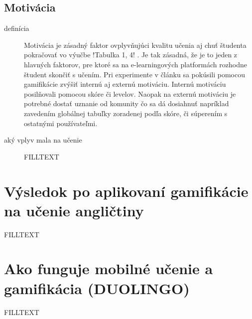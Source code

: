 \documentclass[10pt,slovak,a4paper]{article}
\begin{document}
\subsection{Motivácia} \label{motivation}
\begin{description}
    \item [definícia] Motivácia je zásadný faktor ovplyvňujúci kvalitu učenia aj chuť študenta pokračovať vo výučbe !Tabulka 1, 4! . Je tak zásadná, že je to jeden z hlavných faktorov, pre ktoré sa na e-learningových platformách rozhodne študent skončiť s učením. Pri experimente v článku \cite{arce_valdivia_2020} sa pokúsili pomocou gamifikácie zvýšiť internú aj externú motiváciu. Internú motiváciu posilňovali pomocou skóre či levelov. Naopak na externú motiváciu je potrebné dostať uznanie od komunity čo sa dá dosiahnuť napríklad zavedením globálnej tabuľky zoradenej podľa skóre, či súperením s ostatnými používateľmi.

    \item [aký vplyv mala na učenie] FILLTEXT
\end{description}


\section{Výsledok po aplikovaní gamifikácie na učenie angličtiny} \label{languagegemificationresult}

FILLTEXT


\section{Ako funguje mobilné učenie a gamifikácia (DUOLINGO)} \label{duolingo} %

FILLTEXT

\end{document}
